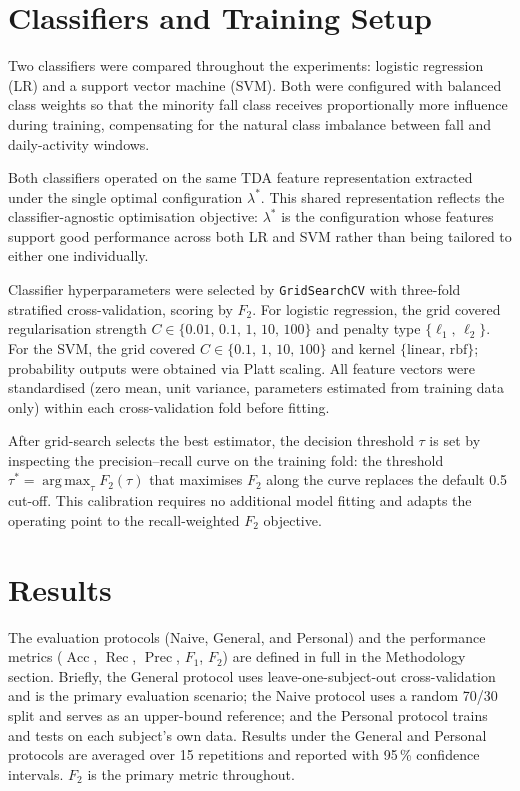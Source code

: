 \documentclass[onluarkali,ingilizce,yukseklisans,karton,LisansustuEgitim]{itutez}
\DeclareMathOperator{\Rec}{Rec}
\DeclareMathOperator{\Prec}{Prec}
\DeclareMathOperator{\Acc}{Acc}
\DeclareMathOperator*{\argmax}{arg\,max}
\providecommand{\1}{\mathbf{1}}
\begin{document}
\section{Classifiers and Training Setup}
\label{sec:exp:classifiers}

Two classifiers were compared throughout the experiments: logistic regression (LR) and a support vector machine (SVM). Both were configured with balanced class weights so that the minority fall class receives proportionally more influence during training, compensating for the natural class imbalance between fall and daily-activity windows.

Both classifiers operated on the same TDA feature representation extracted under the single optimal configuration $\lambda^*$. This shared representation reflects the classifier-agnostic optimisation objective: $\lambda^*$ is the configuration whose features support good performance across both LR and SVM rather than being tailored to either one individually.

Classifier hyperparameters were selected by \texttt{GridSearchCV} with three-fold stratified cross-validation, scoring by $F_2$. For logistic regression, the grid covered regularisation strength $C \in \{0.01,\,0.1,\,1,\,10,\,100\}$ and penalty type $\{\ell_1,\,\ell_2\}$. For the SVM, the grid covered $C \in \{0.1,\,1,\,10,\,100\}$ and kernel $\{\text{linear},\,\text{rbf}\}$; probability outputs were obtained via Platt scaling. All feature vectors were standardised (zero mean, unit variance, parameters estimated from training data only) within each cross-validation fold before fitting.

After grid-search selects the best estimator, the decision threshold $\tau$ is set by inspecting the precision--recall curve on the training fold: the threshold $\tau^* = \argmax_\tau F_2(\tau)$ that maximises $F_2$ along the curve replaces the default 0.5 cut-off. This calibration requires no additional model fitting and adapts the operating point to the recall-weighted $F_2$ objective.

\section{Results}
\label{subsec:results}

The evaluation protocols (Naive, General, and Personal) and the performance metrics ($\Acc$, $\Rec$, $\Prec$, $F_1$, $F_2$) are defined in full in the Methodology section. Briefly, the General protocol uses leave-one-subject-out cross-validation and is the primary evaluation scenario; the Naive protocol uses a random 70/30 split and serves as an upper-bound reference; and the Personal protocol trains and tests on each subject's own data. Results under the General and Personal protocols are averaged over 15 repetitions and reported with 95\,\% confidence intervals. $F_2$ is the primary metric throughout.
\end{document}
